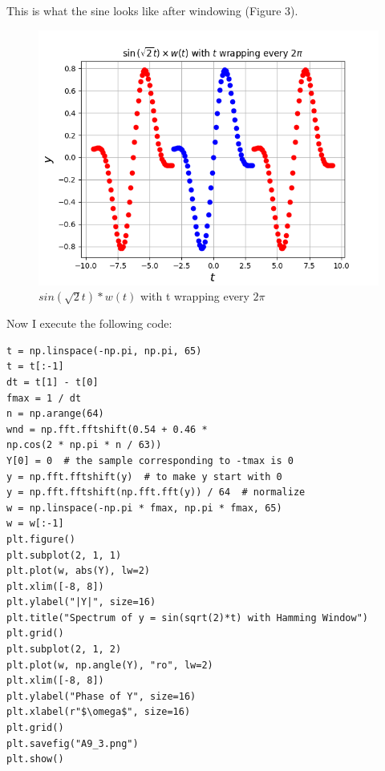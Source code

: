 \documentclass[11pt, a4paper]{article}
\begin{document}
This is what the sine looks like after windowing (Figure 3).  
\begin{figure}[!tbh]
   	\centering
  \includegraphics[scale=0.5]{A9_2.png} 
    \caption{$sin(\sqrt{2}t)*w(t)$ with t wrapping every $2\pi$} 	
   \end{figure}   

Now I execute the following code:
\begin{verbatim}
t = np.linspace(-np.pi, np.pi, 65)
t = t[:-1]
dt = t[1] - t[0]
fmax = 1 / dt
n = np.arange(64)
wnd = np.fft.fftshift(0.54 + 0.46 * 
np.cos(2 * np.pi * n / 63))
Y[0] = 0  # the sample corresponding to -tmax is 0
y = np.fft.fftshift(y)  # to make y start with 0
y = np.fft.fftshift(np.fft.fft(y)) / 64  # normalize
w = np.linspace(-np.pi * fmax, np.pi * fmax, 65)
w = w[:-1]
plt.figure()
plt.subplot(2, 1, 1)
plt.plot(w, abs(Y), lw=2)
plt.xlim([-8, 8])
plt.ylabel("|Y|", size=16)
plt.title("Spectrum of y = sin(sqrt(2)*t) with Hamming Window")
plt.grid()
plt.subplot(2, 1, 2)
plt.plot(w, np.angle(Y), "ro", lw=2)
plt.xlim([-8, 8])
plt.ylabel("Phase of Y", size=16)
plt.xlabel(r"$\omega$", size=16)
plt.grid()
plt.savefig("A9_3.png")
plt.show()

\end{verbatim}
\end{document}
